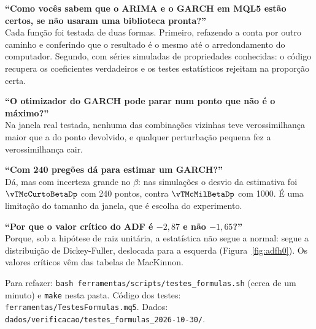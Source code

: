 \documentclass[11pt,a4paper]{article}
\begin{document}
\begin{banca}
\textbf{``Como vocês sabem que o ARIMA e o GARCH em MQL5 estão certos, se não usaram uma biblioteca pronta?''}\\
Cada função foi testada de duas formas. Primeiro, refazendo a conta por outro caminho e conferindo que o
resultado é o mesmo até o arredondamento do computador. Segundo, com séries simuladas de propriedades conhecidas:
o código recupera os coeficientes verdadeiros e os testes estatísticos rejeitam na proporção certa.

\medskip
\textbf{``O otimizador do GARCH pode parar num ponto que não é o máximo?''}\\
Na janela real testada, nenhuma das \vTGradeViaveis{} combinações vizinhas teve verossimilhança maior que a do
ponto devolvido, e qualquer perturbação pequena fez a verossimilhança cair.

\medskip
\textbf{``Com 240 pregões dá para estimar um GARCH?''}\\
Dá, mas com incerteza grande no $\beta$: nas simulações o desvio da estimativa foi $\vTMcCurtoBetaDp$ com 240
pontos, contra $\vTMcMilBetaDp$ com 1000. É uma limitação do tamanho da janela, que é escolha do experimento.

\medskip
\textbf{``Por que o valor crítico do ADF é $-2{,}87$ e não $-1{,}65$?''}\\
Porque, sob a hipótese de raiz unitária, a estatística não segue a normal: segue a distribuição de Dickey-Fuller,
deslocada para a esquerda (Figura~\ref{fig:adfh0}). Os valores críticos vêm das tabelas de MacKinnon.
\end{banca}

\vfill
\footnotesize
Para refazer: \texttt{bash ferramentas/scripts/testes\_formulas.sh} (cerca de um minuto) e \texttt{make} nesta
pasta. Código dos testes: \nolinkurl{ferramentas/TestesFormulas.mq5}. Dados:
\nolinkurl{dados/verificacao/testes_formulas_2026-10-30/}.
\end{document}

